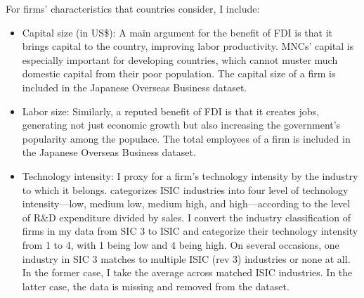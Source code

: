 For firms' characteristics that countries consider, I include:

\begin{itemize}
\item Capital size (in US\$): A main argument for the benefit of FDI is that it brings capital to the country, improving labor productivity. MNCs' capital is especially important for developing countries, which cannot muster much domestic capital from their poor population. The capital size of a firm is included in the Japanese Overseas Business dataset.

\item Labor size: Similarly, a reputed benefit of FDI is that it creates jobs, generating not just economic growth but also increasing the government's popularity among the populace. The total employees of a firm is included in the Japanese Overseas Business dataset.

\item Technology intensity: I proxy for a firm's technology intensity by the industry to which it belongs. \citet{OECD2009} categorizes ISIC industries into four level of technology intensity---low, medium low, medium high, and high---according to the level of R\&D expenditure divided by sales. I convert the industry classification of firms in my data from SIC 3 to ISIC and categorize their technology intensity from 1 to 4, with 1 being low and 4 being high. On several occasions, one industry in SIC 3 matches to multiple ISIC (rev 3) industries or none at all. In the former case, I take the average across matched ISIC industries. In the latter case, the data is missing and removed from the dataset.
\end{itemize}